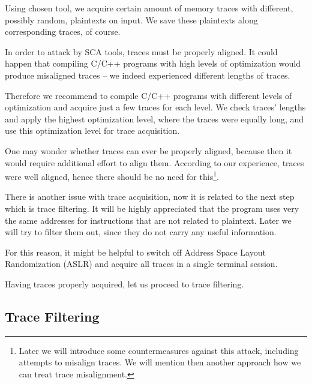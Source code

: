 Using chosen tool, we acquire certain amount of memory traces with different, possibly random, plaintexts on input. We save these plaintexts along corresponding traces, of course.

\begin{note}
\label{note:optim}
	In order to attack by SCA tools, traces must be properly aligned. It could happen that compiling C/C++ programs with high levels of optimization would produce misaligned traces -- we indeed experienced different lengths of traces.
	
	Therefore we recommend to compile C/C++ programs with different levels of optimization and acquire just a few traces for each level. We check traces' lengths and apply the highest optimization level, where the traces were equally long, and use this optimization level for trace acquisition.
\end{note}

One may wonder whether traces can ever be properly aligned, because then it would require additional effort to align them. According to our experience, traces were well aligned, hence there should be no need for this\footnote{Later we will introduce some countermeasures against this attack, including attempts to misalign traces. We will mention then another approach how we can treat trace misalignment.}.

\begin{note}
\label{note:aslr}
	There is another issue with trace acquisition, now it is related to the next step which is trace filtering. It will be highly appreciated that the program uses very the same addresses for instructions that are not related to plaintext. Later we will try to filter them out, since they do not carry any useful information.
	
	For this reason, it might be helpful to switch off Address Space Layout Randomization (ASLR) and acquire all traces in a single terminal session.
\end{note}

Having traces properly acquired, let us proceed to trace filtering.



\subsection{Trace Filtering}
\label{sec:filter}

